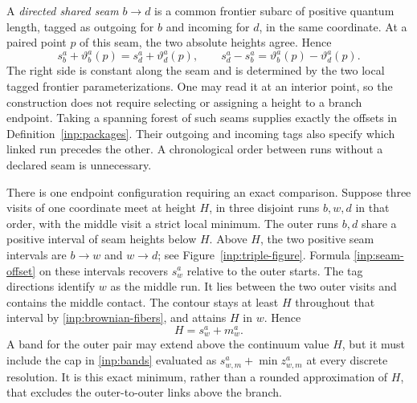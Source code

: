 A \emph{directed shared seam} $b\to d$ is a common frontier subarc
of positive quantum length, tagged as outgoing for $b$ and incoming
for $d$, in the same coordinate.  At a paired point $p$ of this
seam, the two absolute heights agree.  Hence
\begin{equation}\label{inp:seam-offset}
 s_b^a+\vartheta_b^a(p)=s_d^a+\vartheta_d^a(p),
 \qquad
 s_d^a-s_b^a=\vartheta_b^a(p)-\vartheta_d^a(p).
\end{equation}
The right side is constant along the seam and is determined by the
two local tagged frontier parameterizations.  One may read it at an
interior point, so the construction does not require selecting or
assigning a height to a branch endpoint.  Taking a spanning forest
of such seams supplies exactly the offsets in
Definition~\ref{inp:packages}.  Their outgoing and incoming tags
also specify which linked run precedes the other.  A chronological
order between runs without a declared seam is unnecessary.

There is one endpoint configuration requiring an exact comparison.
Suppose three visits of one coordinate meet at height $H$, in three
disjoint runs $b,w,d$ in that order, with the middle visit a strict
local minimum.
The outer runs $b,d$ share a positive interval of seam heights below
$H$.  Above $H$, the two positive seam intervals are $b\to w$ and
$w\to d$; see Figure~\ref{inp:triple-figure}.  Formula
\eqref{inp:seam-offset} on these intervals recovers $s_w^a$ relative
to the outer starts.  The tag directions identify $w$ as the middle
run.  It lies between the two outer visits and contains the middle
contact.  The contour stays at least $H$ throughout that interval
by \eqref{inp:brownian-fibers}, and attains $H$ in $w$.  Hence
\begin{equation}\label{inp:exact-cap}
                       H=s_w^a+m_w^a.
\end{equation}
A band for the outer pair may extend above the continuum value
$H$, but it must include the cap in \eqref{inp:bands} evaluated
as $s_{w,m}^a+\min z_{w,m}^a$ at every discrete resolution.
It is this exact minimum, rather than a rounded approximation of
$H$, that excludes the outer-to-outer links above the branch.

